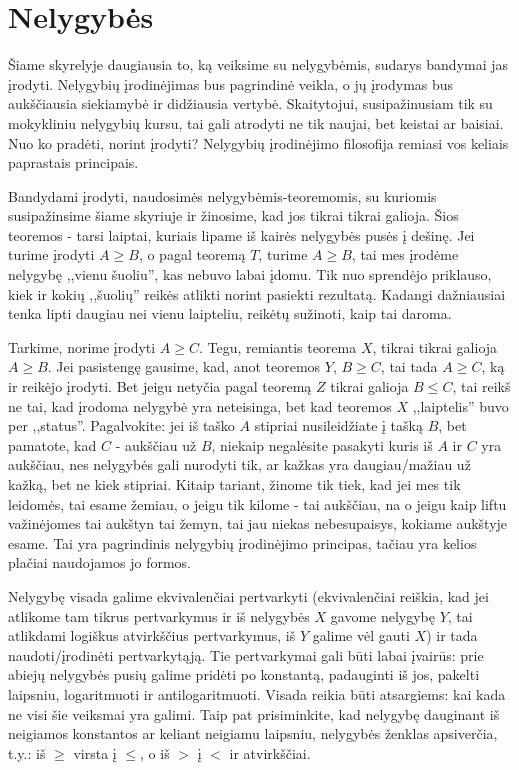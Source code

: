 \section{Nelygybės}

Šiame skyrelyje daugiausia to, ką veiksime su nelygybėmis, sudarys bandymai
jas įrodyti. Nelygybių įrodinėjimas bus pagrindinė veikla, o jų įrodymas
bus aukščiausia siekiamybė ir didžiausia vertybė. Skaitytojui,
susipažinusiam tik su mokykliniu nelygybių kursu, tai gali atrodyti ne tik
naujai, bet keistai ar baisiai. Nuo ko pradėti, norint įrodyti? Nelygybių
įrodinėjimo filosofija remiasi vos keliais paprastais principais.

Bandydami įrodyti, naudosimės nelygybėmis-teoremomis, su kuriomis
susipažinsime šiame skyriuje ir žinosime, kad jos tikrai tikrai galioja.
Šios teoremos - tarsi laiptai, kuriais lipame iš kairės nelygybės pusės į
dešinę. Jei turime įrodyti $A\geq B$, o pagal teoremą $T$, turime
$A\geq B$, tai mes įrodėme nelygybę ,,vienu šuoliu'', kas nebuvo labai
įdomu. Tik nuo sprendėjo priklauso, kiek ir kokių ,,šuolių'' reikės atlikti
norint pasiekti rezultatą. Kadangi dažniausiai tenka lipti daugiau nei
vienu laipteliu, reikėtų sužinoti, kaip tai daroma.

Tarkime, norime įrodyti $A\geq C$. Tegu, remiantis teorema $X$,
tikrai tikrai galioja $A\geq B$. Jei pasistengę gausime, kad, anot
teoremos $Y$, $B\geq C$, tai tada $A\geq C$, ką ir reikėjo įrodyti. Bet
jeigu netyčia pagal teoremą $Z$ tikrai galioja $B\leq C$, tai reikš
ne tai, kad įrodoma nelygybė yra neteisinga, bet kad teoremos $X$
,,laiptelis'' buvo per ,,status''. Pagalvokite: jei iš taško $A$ stipriai
nusileidžiate į tašką $B$, bet pamatote, kad $C$ - aukščiau už $B$,
niekaip negalėsite pasakyti kuris iš $A$ ir $C$ yra aukščiau, nes nelygybės
gali nurodyti tik, ar kažkas yra daugiau/mažiau už kažką, bet ne kiek
stipriai. Kitaip tariant, žinome tik tiek, kad jei mes tik leidomės, tai
esame žemiau, o jeigu tik kilome - tai aukščiau, na o jeigu kaip liftu
važinėjomes tai aukštyn tai žemyn, tai jau niekas nebesupaisys, kokiame
aukštyje esame. Tai yra pagrindinis nelygybių įrodinėjimo principas, tačiau
yra kelios plačiai naudojamos jo formos.

Nelygybę visada galime ekvivalenčiai pertvarkyti (ekvivalenčiai reiškia,
kad jei atlikome tam tikrus pertvarkymus ir iš nelygybės $X$ gavome
nelygybę $Y$, tai atlikdami logiškus atvirkščius pertvarkymus, iš $Y$
galime vėl gauti $X$) ir tada naudoti/įrodinėti pertvarkytąją. Tie
pertvarkymai gali būti labai įvairūs: prie abiejų nelygybės pusių galime
pridėti po konstantą, padauginti iš jos, pakelti laipsniu, logaritmuoti ir
antilogaritmuoti. Visada reikia būti atsargiems: kai kada ne visi šie
veiksmai yra galimi. Taip pat prisiminkite, kad nelygybę dauginant iš
neigiamos konstantos ar keliant neigiamu laipsniu, nelygybės ženklas
apsiverčia, t.y.: iš $\geq$ virsta į $\leq$, o iš $>$ į $<$ ir atvirkščiai.


